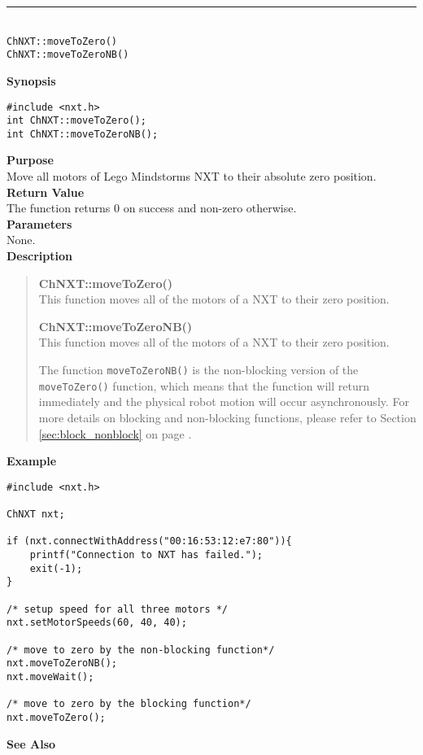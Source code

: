 \noindent
\vspace{5pt}
\rule{4.5in}{0.015in}\\
\noindent
{\LARGE \texttt{ChNXT::moveToZero()} }\\
{\LARGE \texttt{ChNXT::moveToZeroNB()} }\\


\noindent
{\bf Synopsis}
\begin{lstlisting}
#include <nxt.h>
int ChNXT::moveToZero();
int ChNXT::moveToZeroNB();
\end{lstlisting}

\noindent
{\bf Purpose}\\
Move all motors of Lego Mindstorms NXT to their absolute zero position. \\

\noindent
{\bf Return Value}\\
The function returns 0 on success and non-zero otherwise.\\

\noindent
{\bf Parameters}\\
None.\\

\noindent
{\bf Description}\\
\vspace{-12pt}
\begin{quote}
{\bf ChNXT::moveToZero()}\\
This function moves all of the motors of a NXT to their zero 
position.

{\bf ChNXT::moveToZeroNB()}\\
This function moves all of the motors of a NXT to their zero 
position.

The function \texttt{moveToZeroNB()} is the non-blocking version 
of the \texttt{moveToZero()} function, which means that the 
function will return immediately and the physical robot motion 
will occur asynchronously. For more details on blocking and 
non-blocking functions, please refer to Section \ref{sec:block_nonblock}
on page \pageref{sec:block_nonblock}.\\
\end{quote}

\noindent
{\bf Example}
\begin{lstlisting}
#include <nxt.h> 

ChNXT nxt;

if (nxt.connectWithAddress("00:16:53:12:e7:80")){
    printf("Connection to NXT has failed.");
    exit(-1);
}
 
/* setup speed for all three motors */
nxt.setMotorSpeeds(60, 40, 40);

/* move to zero by the non-blocking function*/
nxt.moveToZeroNB();
nxt.moveWait();

/* move to zero by the blocking function*/
nxt.moveToZero();
\end{lstlisting}

\noindent
{\bf See Also}\\
